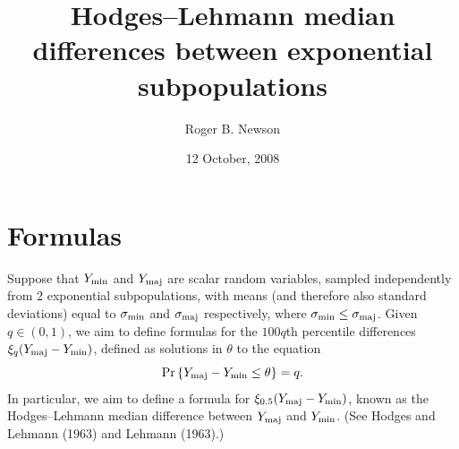 \documentclass[a4paper]{article}      %
\title{Hodges--Lehmann median differences between exponential subpopulations}  %
\author{Roger B. Newson}      %
\date{12 October, 2008}      %
\begin{document}

\maketitle                   %

\section{Formulas}

\def\Ymin{Y_{\rm min}}
\def\Ymaj{Y_{\rm maj}}
\def\sigmamin{\sigma_{\rm min}}
\def\sigmamaj{\sigma_{\rm maj}}
\def\Pr{{\rm Pr}}
Suppose that $\Ymin$ and $\Ymaj$ are scalar random variables, sampled independently from 2 exponential subpopulations,
with means (and therefore also standard deviations) equal to
$\sigmamin$ and $\sigmamaj$ respectively, where $\sigmamin \le \sigmamaj$.
Given $q \in (0,1)$, we aim to define formulas for the $100q$th percentile differences $\xi_q ( \Ymaj - \Ymin )$,
defined as solutions in $\theta$ to the equation
\begin{equation}
\Pr \left\{ \Ymaj - \Ymin \le \theta \right\} = q .
\label{eq:eqseq1}
\end{equation}
In particular, we aim to define a formula for $\xi_{0.5} ( \Ymaj - \Ymin )$,
known as the Hodges--Lehmann median difference between $\Ymaj$ and $\Ymin$.
(See Hodges and Lehmann (1963) and Lehmann (1963).)
\end{document}
